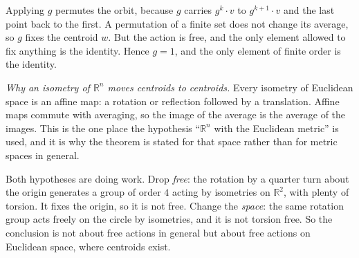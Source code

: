 \documentclass[10pt]{article}
\newcommand{\R}{\mathbb{R}}
\begin{document}
{\begin{minipage}[t]{744pt}
{
}\par\vspace{3pt}
\begin{minipage}[t]{372pt}\vspace{0pt}
Applying $g$ permutes the orbit, because $g$ carries $g^k\cdot v$ to $g^{k+1}\cdot v$ and the last point back to the first. A permutation of a finite set does not change its average, so $g$ fixes the centroid $w$. But the action is free, and the only element allowed to fix anything is the identity. Hence $g=1$, and the only element of finite order is the identity.
\begin{why}
\emph{Why an isometry of $\R^n$ moves centroids to centroids.} Every isometry of Euclidean space is an affine map: a rotation or reflection followed by a translation. Affine maps commute with averaging, so the image of the average is the average of the images. This is the one place the hypothesis ``$\R^n$ with the Euclidean metric'' is used, and it is why the theorem is stated for that space rather than for metric spaces in general.
\end{why}
\end{minipage}\hfill
\begin{minipage}[t]{352pt}\vspace{0pt}
\begin{pitfall}
Both hypotheses are doing work.
Drop \emph{free}: the rotation by a quarter turn about the origin generates a group of order $4$ acting by isometries on $\R^2$, with plenty of torsion. It fixes the origin, so it is not free.
Change the \emph{space}: the same rotation group acts freely on the circle by isometries, and it is not torsion free. So the conclusion is not about free actions in general but about free actions on Euclidean space, where centroids exist.

\end{pitfall}
\end{minipage}
\end{minipage}}
\end{document}
